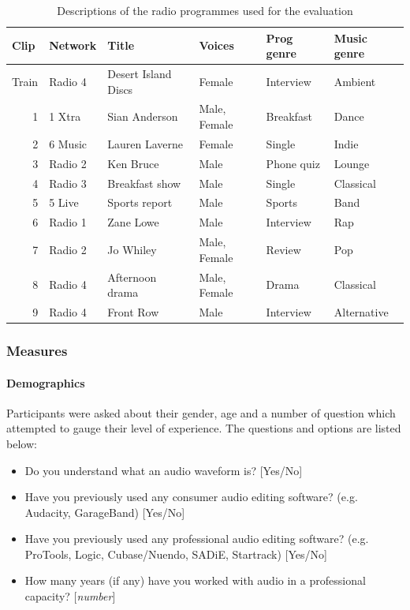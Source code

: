 \begin{table}[htbp]
  \begin{center}
    \begin{tabular}{|r|l|l|l|l|l|}
      \hline
      \multicolumn{1}{|l|}{\textbf{Clip}} & \textbf{Network} & \textbf{Title} &
      \textbf{Voices} & \textbf{Prog genre} & \textbf{Music genre} \\ \hline
      Train & Radio 4 & Desert Island Discs & Female & Interview & Ambient \\ \hline
      1 & 1 Xtra & Sian Anderson & Male, Female & Breakfast & Dance \\ \hline
      2 & 6 Music & Lauren Laverne & Female & Single & Indie \\ \hline
      3 & Radio 2 & Ken Bruce & Male & Phone quiz & Lounge \\ \hline
      4 & Radio 3 & Breakfast show & Male & Single & Classical \\ \hline
      5 & 5 Live & Sports report & Male & Sports & Band \\ \hline
      6 & Radio 1 & Zane Lowe & Male & Interview & Rap \\ \hline
      7 & Radio 2 & Jo Whiley & Male, Female & Review & Pop \\ \hline
      8 & Radio 4 & Afternoon drama & Male, Female & Drama & Classical \\ \hline
      9 & Radio 4 & Front Row & Male & Interview & Alternative \\ \hline
    \end{tabular}
  \end{center}
  \caption{Descriptions of the radio programmes used for the evaluation}
  \label{tab:clips}
\end{table}

\subsubsection{Measures}\label{sec:measures}
\paragraph{Demographics}
Participants were asked about their gender, age and a number of question which
attempted to gauge their level of experience. The questions and options are
listed below:

{\singlespacing
\begin{itemize}
  \item Do you understand what an audio waveform is? [Yes/No]
  \item Have you previously used any consumer audio editing software? (e.g.
    Audacity, GarageBand) [Yes/No]
  \item Have you previously used any professional audio editing software? (e.g.
    ProTools, Logic, Cubase/Nuendo, SADiE, Startrack) [Yes/No]
  \item How many years (if any) have you worked with audio in a professional
    capacity? [\textit{number}]
\end{itemize}
}


